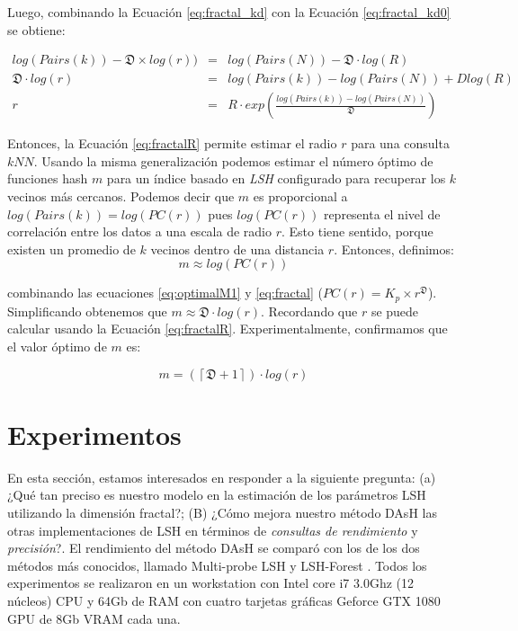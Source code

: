 Luego, combinando la Ecuación \ref{eq:fractal_kd} con la Ecuación \ref{eq:fractal_kd0} se obtiene:

\begin{eqnarray}\label{eq:fractalR}
  log (Pairs(k)) - \mathfrak{D} \times log (r)) &=& log (Pairs(N)) - \mathfrak{D} \cdot log (R)   \nonumber \\
  \mathfrak{D} \cdot log (r) &=& log (Pairs (k)) - log (Pairs(N)) + D log (R)   \nonumber \\
  r &=& R \cdot  exp (  \frac{log (Pairs (k)) - log (Pairs(N))}{ \mathfrak{D} } )    
\end{eqnarray}

Entonces, la Ecuación \ref{eq:fractalR} permite estimar el radio $r$ para una consulta  $kNN$.  Usando la misma generalización podemos estimar  el número óptimo de funciones hash $m$ para un índice basado en \textit{LSH} configurado para recuperar los $k$ vecinos más cercanos. Podemos decir que $m$ es proporcional a $log ( Pairs(k) ) = log ( PC(r) )$ pues $log ( PC(r) )$ representa el nivel de correlación entre los datos a una escala de radio $r$. Esto tiene sentido, porque existen un promedio de $k$ vecinos  dentro de una distancia $r$. Entonces, definimos:
\begin{equation}\label{eq:optimalM1}
   m \approx log (PC(r)) 
\end{equation}

combinando las ecuaciones \ref{eq:optimalM1} y \ref{eq:fractal}  ($PC(r) = K_p \times r^{\mathfrak{D}}$). Simplificando obtenemos  que $m \approx \mathfrak{D} \cdot log (r)  $. Recordando que $r$ se puede calcular usando la Ecuación \ref{eq:fractalR}. Experimentalmente, confirmamos que el valor óptimo de $m$ es:

 \begin{equation}\label{eq:fractalm}
    m = (\left\lceil \mathfrak{D} + 1 \right\rceil  ) \cdot  log (r)
 \end{equation}
 
\section{Experimentos}

En esta sección, estamos interesados en responder a la siguiente pregunta: (a) ¿Qué tan preciso es nuestro modelo en la estimación de los parámetros LSH utilizando la dimensión fractal?; (B) ¿Cómo mejora nuestro método DAsH las otras implementaciones de LSH en términos de \textit{consultas de rendimiento} y \textit{precisión}?. El rendimiento del método DAsH se comparó con los de los dos métodos más conocidos, llamado Multi-probe LSH \cite{multiprobe} y LSH-Forest \cite{lshforest}. Todos los experimentos se realizaron en un workstation con Intel core i7  3.0Ghz (12 núcleos) CPU y 64Gb de RAM con cuatro tarjetas gráficas Geforce GTX 1080 GPU de 8Gb VRAM cada una.
 
